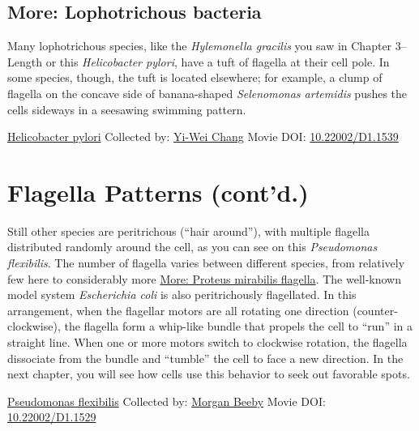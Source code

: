 \documentclass[]{tufte-book}
\begin{document}
\hypertarget{Lophotrichous_bacteria}{%
\subsection*{More: Lophotrichous bacteria}\label{Lophotrichous_bacteria}}

Many lophotrichous species, like the \emph{Hylemonella gracilis} you saw in Chapter 3--Length or this \emph{Helicobacter pylori}, have a tuft of flagella at their cell pole. In some species, though, the tuft is located elsewhere; for example, a clump of flagella on the concave side of banana-shaped \emph{Selenomonas artemidis} pushes the cells sideways in a seesawing swimming pattern.



\hypertarget{htmlwidget-248d148a8ed6511007b3}{}

\label{fig:6-4a}\protect\hyperlink{tree}{Helicobacter pylori} Collected by: \protect\hyperlink{yi-wei_chang}{Yi-Wei Chang} Movie DOI: \href{https://doi.org/10.22002/D1.1539}{10.22002/D1.1539}

\hypertarget{flagella-patterns-contd.}{%
\section{Flagella Patterns (cont'd.)}\label{flagella-patterns-contd.}}

Still other species are peritrichous (``hair around''), with multiple flagella distributed randomly around the cell, as you can see on this \emph{Pseudomonas flexibilis}. The number of flagella varies between different species, from relatively few here to considerably more \protect\hyperlink{Proteus_mirabilis_flagella}{More: Proteus mirabilis flagella}. The well-known model system \emph{Escherichia coli} is also peritrichously flagellated. In this arrangement, when the flagellar motors are all rotating one direction (counter-clockwise), the flagella form a whip-like bundle that propels the cell to ``run'' in a straight line. When one or more motors switch to clockwise rotation, the flagella dissociate from the bundle and ``tumble'' the cell to face a new direction. In the next chapter, you will see how cells use this behavior to seek out favorable spots.



\hypertarget{htmlwidget-197d6118034302badb99}{}

\label{fig:6-5}\protect\hyperlink{tree}{Pseudomonas flexibilis} Collected by: \protect\hyperlink{morgan_beeby}{Morgan Beeby} Movie DOI: \href{https://doi.org/10.22002/D1.1529}{10.22002/D1.1529}
\end{document}
